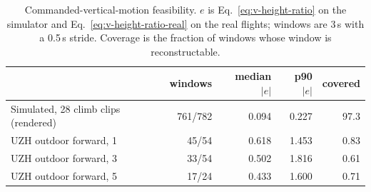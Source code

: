 \begin{table}[t]
\centering
\small
\begin{tabular}{@{}lrrrr@{}}
\toprule
 & windows & median $|e|$ & p90 $|e|$ & covered \\
\midrule
Simulated, 28 climb clips (rendered) & 761/782 & 0.094 & 0.227 & 97.3 \\
UZH outdoor forward, 1 & 45/54 & 0.618 & 1.453 & 0.83 \\
UZH outdoor forward, 3 & 33/54 & 0.502 & 1.816 & 0.61 \\
UZH outdoor forward, 5 & 17/24 & 0.433 & 1.600 & 0.71 \\
\bottomrule
\end{tabular}
\caption{Commanded-vertical-motion feasibility. $e$ is Eq.~\ref{eq:v-height-ratio} on the
simulator and Eq.~\ref{eq:v-height-ratio-real} on the real flights; windows are 3\,s with a
0.5\,s stride. Coverage is the fraction of windows whose window is reconstructable.}
\label{tab:v-feasibility}
\end{table}
